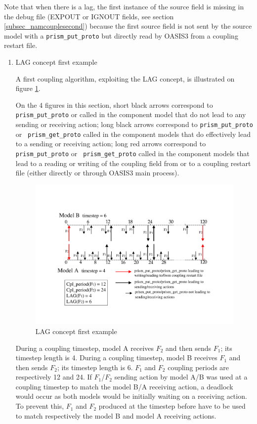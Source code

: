 Note that when there is a lag, the first instance of the source field
is missing in the debug file (EXPOUT or IGNOUT fields, see section
\ref{subsec_namcouplesecond}) because the first source field is not
sent by the source model with a {\tt prism\_put\_proto} but directly
read by OASIS3 from a coupling restart file.
 
  \begin{enumerate}

  \item LAG concept first example
 
  A first coupling algorithm, exploiting the LAG concept, is
  illustrated on figure \ref{fig:lag_concept_1}. 


  On the 4 figures in this section, short black arrows correspond to {\tt
  prism\_put\_proto} or  called in the component model
  that do not lead to any sending or receiving action;
  long black arrows correspond to {\tt prism\_put\_proto} or {\tt
  prism\_get\_proto} called in the component models that do
  effectively lead to a sending or receiving action;
  long red arrows correspond to {\tt prism\_put\_proto} or {\tt
  prism\_get\_proto} called in the component models that lead to a
  reading or writing of the coupling field from or to a coupling
  restart file (either directly or through OASIS3 main process).

\begin{figure}
\includegraphics[scale=.6]{figures/fig_lag_concept_1}
\caption{LAG concept first example} 
\label{fig:lag_concept_1}
\end{figure}

  During a coupling timestep, model A receives $F_2$ and then sends $F_1$; its
  timestep length is 4. During a coupling timestep, model B receives $F_1$
  and then sends $F_2$; its timestep length is 6.  $F_1$ and $F_2$
  coupling periods are respectively 12 and 24. If $F_1$/$F_2$ sending
  action by model A/B was used at a coupling timestep to match the
  model B/A receiving action, a deadlock would occur as both models
  would be initially waiting on a receiving action. To prevent this,
  $F_1$ and $F_2$ produced at the timestep before have to be used to
  match respectively the model B and model A receiving actions.


\end{enumerate}
